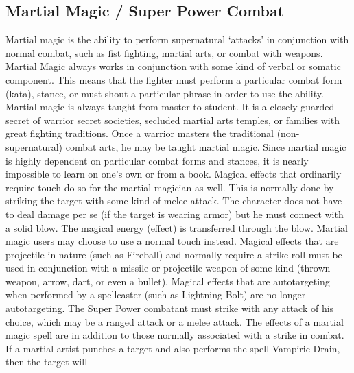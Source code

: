 \documentclass[twoside]{book}
\begin{document}
\subsection{Martial Magic / Super Power Combat}
      Martial magic is the ability to perform
               supernatural `attacks' in conjunction with
               normal combat, such as fist fighting, martial arts, or
               combat with weapons.   Martial Magic always works in conjunction with some
               kind of verbal or somatic component. This means that the
               fighter must perform a particular combat form (kata),
               stance, or must shout a particular phrase in order to use
               the ability.   Martial magic is always taught from master to
               student. It is a closely guarded secret of warrior secret
               societies, secluded martial arts temples, or families with
               great fighting traditions. Once a warrior masters the
               traditional (non-supernatural) combat arts, he may be
               taught martial magic. Since martial magic is highly
               dependent on particular combat forms and stances, it is
               nearly impossible to learn on one's own or from a
               book.   Magical effects that ordinarily require touch do so
               for the martial magician as well. This is normally done by
               striking the target with some kind of melee attack. The
               character does not have to deal damage per se (if the
               target is wearing armor) but he must connect with a solid
               blow. The magical energy (effect) is transferred through
               the blow. Martial magic users may choose to use a normal
               touch instead.   Magical effects that are projectile in nature (such
               as Fireball) and normally require a strike roll must be
               used in conjunction with a missile or projectile weapon of
               some kind (thrown weapon, arrow, dart, or even a bullet).
                 Magical effects that are autotargeting when
               performed by a spellcaster (such as Lightning Bolt) are no
               longer autotargeting. The Super Power combatant must
               strike with any attack of his choice, which may be a
               ranged attack or a melee attack.   The effects of a martial magic spell are in
               addition to those normally associated with a strike in
               combat. If a martial artist punches a target and also
               performs the spell Vampiric Drain, then the target will
\end{document}
